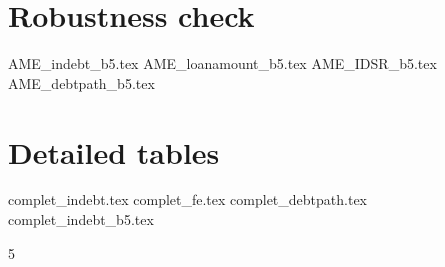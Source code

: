 \documentclass[a4paper, 11pt, onecolumn]{article}
\begin{document}





\clearpage
\newpage
\section{Robustness check}
\label{app:rob}

{AME_indebt_b5.tex}
{AME_loanamount_b5.tex}
{AME_IDSR_b5.tex}
{AME_debtpath_b5.tex}



\clearpage
\newpage
\section{Detailed tables}
\label{app:rob}
{complet_indebt.tex}
\clearpage
\newpage
{complet_fe.tex}
\clearpage
\newpage
{complet_debtpath.tex}
\clearpage
\newpage
{complet_indebt_b5.tex}



\clearpage
\newpage
\setcounter{tocdepth}5
\tableofcontents

\end{document}
